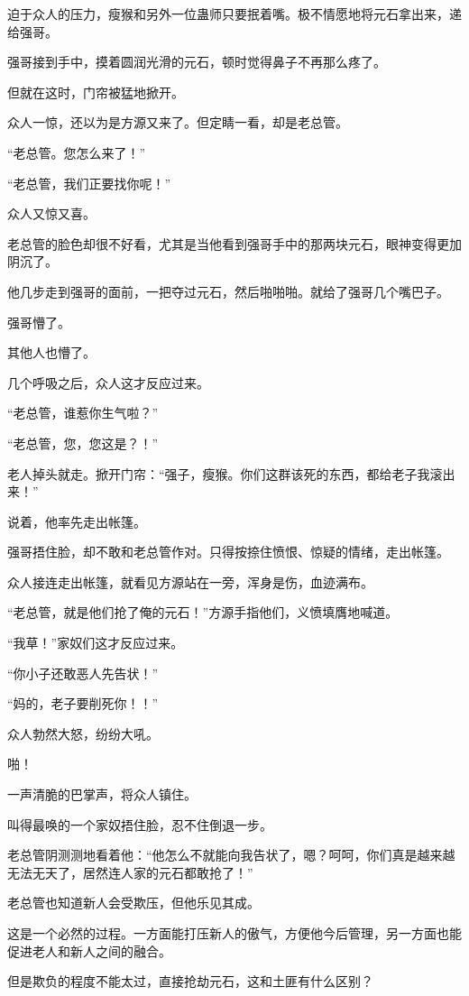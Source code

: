 \begin{this_body}
迫于众人的压力，瘦猴和另外一位蛊师只要抿着嘴。极不情愿地将元石拿出来，递给强哥。

强哥接到手中，摸着圆润光滑的元石，顿时觉得鼻子不再那么疼了。

但就在这时，门帘被猛地掀开。

众人一惊，还以为是方源又来了。但定睛一看，却是老总管。

“老总管。您怎么来了！”

“老总管，我们正要找你呢！”

众人又惊又喜。

老总管的脸色却很不好看，尤其是当他看到强哥手中的那两块元石，眼神变得更加阴沉了。

他几步走到强哥的面前，一把夺过元石，然后啪啪啪。就给了强哥几个嘴巴子。

强哥懵了。

其他人也懵了。

几个呼吸之后，众人这才反应过来。

“老总管，谁惹你生气啦？”

“老总管，您，您这是？！”

老人掉头就走。掀开门帘：“强子，瘦猴。你们这群该死的东西，都给老子我滚出来！”

说着，他率先走出帐篷。

强哥捂住脸，却不敢和老总管作对。只得按捺住愤恨、惊疑的情绪，走出帐篷。

众人接连走出帐篷，就看见方源站在一旁，浑身是伤，血迹满布。

“老总管，就是他们抢了俺的元石！”方源手指他们，义愤填膺地喊道。

“我草！”家奴们这才反应过来。

“你小子还敢恶人先告状！”

“妈的，老子要削死你！！”

众人勃然大怒，纷纷大吼。

啪！

一声清脆的巴掌声，将众人镇住。

叫得最唤的一个家奴捂住脸，忍不住倒退一步。

老总管阴测测地看着他：“他怎么不就能向我告状了，嗯？呵呵，你们真是越来越无法无天了，居然连人家的元石都敢抢了！”

老总管也知道新人会受欺压，但他乐见其成。

这是一个必然的过程。一方面能打压新人的傲气，方便他今后管理，另一方面也能促进老人和新人之间的融合。

但是欺负的程度不能太过，直接抢劫元石，这和土匪有什么区别？


\end{this_body}
